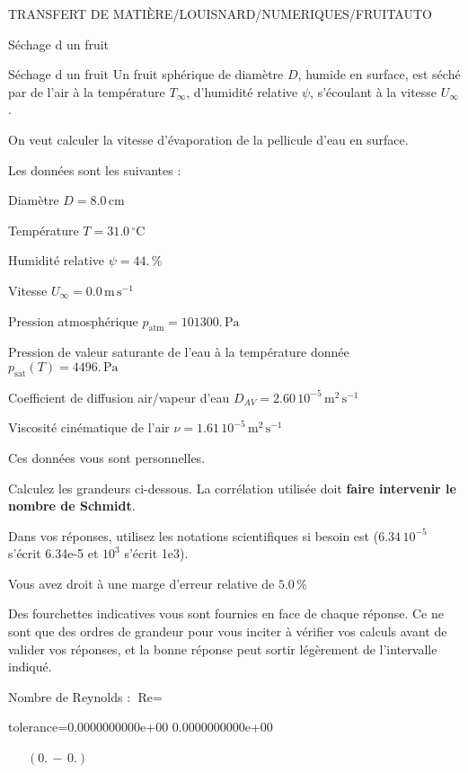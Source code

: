 \documentclass[12pt]{article}
\begin{document}
\begin{quiz}{TRANSFERT DE MATIÈRE/LOUISNARD/NUMERIQUES/FRUITAUTO}
\begin{cloze}{Séchage d un fruit}
\end{cloze} 


 \begin{cloze}{Séchage d un fruit} 
Un fruit sphérique de diamètre $D$, humide en surface, est séché par de l'air à la température $T_\infty$, d'humidité relative $\psi$, s'écoulant à la vitesse $U_\infty$.

On veut calculer la vitesse d'évaporation de la pellicule d'eau en surface.

 

Les données sont les suivantes :

 

Diamètre $D = 8.0\,  \mathrm{cm} $

Température $T = 31.0\,  \mathrm{^\circ\mathrm{C}} $

Humidité relative $\psi = 44.\, \% $

Vitesse $U_\infty = 0.0\,  \mathrm{m}\,  \mathrm{s}^{-1} $

Pression atmosphérique $p_{\text{atm}} = 101300.\,  \mathrm{Pa} $

Pression de valeur saturante de l’eau à la température donnée $p_{\text{sat}}(T) = 4496.\,  \mathrm{Pa} $

Coefficient de diffusion air/vapeur d’eau $D_{AV} =  2.60 \, 10^{-5} \,  \mathrm{m}^{2}\,  \mathrm{s}^{-1} $

Viscosité cinématique de l’air $\nu =  1.61 \, 10^{-5} \,  \mathrm{m}^{2}\,  \mathrm{s}^{-1} $

Ces données vous sont personnelles.

 

Calculez les grandeurs ci-dessous. La corrélation utilisée doit \textbf{faire intervenir le nombre de Schmidt}.

Dans vos réponses, utilisez les notations scientifiques si besoin est ($6.34\, 10^{-5}$ s'écrit 6.34e-5 et $10^{3}$ s'écrit 1e3).

Vous avez droit à une marge d'erreur relative de $5.0\, \% $

Des fourchettes indicatives vous sont fournies en face de chaque réponse. Ce ne sont que des ordres de grandeur pour vous inciter à vérifier vos calculs avant de valider vos réponses, et la bonne réponse peut sortir légèrement de l'intervalle indiqué.

 

Nombre de Reynolds : $\text{Re} =  $
\begin{numerical}[points=1] 
\item[tolerance={0.0000000000e+00}] 0.0000000000e+00 
\end{numerical} 
 $\,$ 
 $ \quad (0. \, - \, 0.) $ 


\end{cloze}
\end{quiz}
\end{document}
